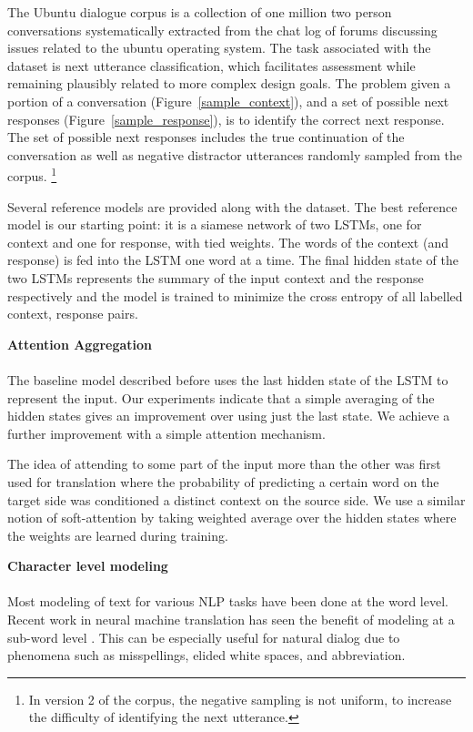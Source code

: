\documentclass[11pt]{article}
\begin{document}
The Ubuntu dialogue corpus is a collection of one million two
person conversations systematically extracted from the chat log
of forums discussing issues related to the ubuntu operating system.
The task associated with the dataset is next utterance classification,
which facilitates assessment while remaining plausibly related to more
complex design goals.  The problem given a portion of a conversation (Figure~\ref{sample_context}), and a set of possible next
responses (Figure~\ref{sample_response}), is to identify the correct next response.  The set of possible
next responses includes the true continuation of the conversation as well
as negative distractor utterances randomly sampled from the corpus.
\footnote{In version 2 of the corpus, the negative sampling is not
uniform, to increase the difficulty of identifying the next utterance.}

Several reference models are provided along with the dataset.  The best
reference model is our starting point: it is a siamese network of two
LSTMs, one for context and one for response, with tied weights. The
words of the context (and response) is fed into the LSTM one word at a
time. The final hidden state of the two LSTMs represents the summary of the
input context and the response respectively and the model is trained to
minimize the cross entropy of all labelled context, response pairs.

\textbf{Attention Aggregation}\label{attention_aggregation}\\\\

The baseline model described before uses the last hidden state of the LSTM
to represent the input. Our experiments indicate that a simple averaging
of the hidden states gives an improvement over using just the last state.
We achieve a further improvement with a simple attention mechanism.

The idea of attending to some part of the input more than the other was first used for translation \cite{DBLP:journals/corr/BahdanauCB14} where the probability of predicting a certain word on the target side was conditioned a distinct context on the source side. We use a similar notion of soft-attention by taking weighted average over the hidden states where the weights are learned during training. 

\textbf{Character level modeling}\label{character_level_modeling}\\\\

Most modeling of text for various NLP tasks have been done at the word
level. Recent work in neural machine translation has seen the benefit of modeling at a
sub-word level \cite{DBLP:conf/acl/Costa-JussaF16}. This can be especially
useful for natural dialog due to phenomena such as misspellings, elided
white spaces, and abbreviation.
\end{document}
